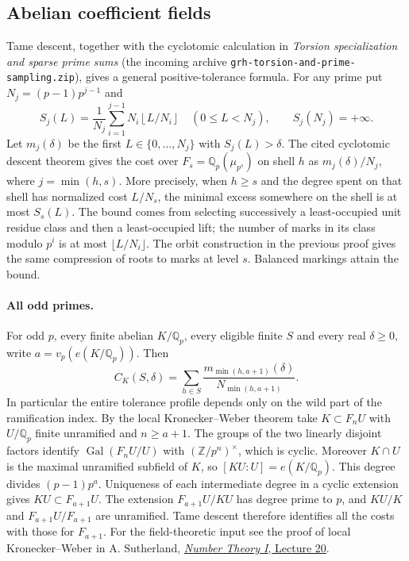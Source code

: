 \subsection*{Abelian coefficient fields}
Tame descent, together with the cyclotomic calculation in
\emph{Torsion specialization and sparse prime sums} (the incoming
archive \texttt{grh-torsion-and-prime-sampling.zip}), gives a general
positive-tolerance formula. For any prime put $N_j=(p-1)p^{j-1}$ and
\[
 S_j(L)=\frac1{N_j}\sum_{i=1}^{j-1}N_i
          \left\lfloor L/N_i\right\rfloor\quad(0\le L<N_j),
 \qquad S_j(N_j)=+\infty .
\]
Let $m_j(\delta)$ be the first $L\in\{0,\ldots,N_j\}$ with
$S_j(L)>\delta$. The cited cyclotomic descent theorem gives the cost over
$F_s=\mathbb Q_p(\mu_{p^s})$ on shell $h$ as
$m_j(\delta)/N_j$, where $j=\min(h,s)$. More precisely, when $h\ge s$
and the degree spent on that shell has normalized cost $L/N_s$, the
minimal excess somewhere on the shell is at most $S_s(L)$. The bound
comes from selecting successively a least-occupied unit residue class
and then a least-occupied lift; the number of marks in its class
modulo $p^i$ is at most $\lfloor L/N_i\rfloor$. The orbit construction
in the previous proof gives the same compression of roots to marks at
level $s$. Balanced markings attain the bound.

\paragraph{All odd primes.}
For odd $p$, every finite abelian $K/\mathbb Q_p$, every eligible finite
$S$ and every real $\delta\ge0$, write $a=v_p(e(K/\mathbb Q_p))$.
Then
\[
 C_K(S,\delta)=\sum_{h\in S}
   \frac{m_{\min(h,a+1)}(\delta)}{N_{\min(h,a+1)}} .
\]
In particular the entire tolerance profile depends only on the wild part
of the ramification index.
By the local Kronecker--Weber theorem take $K\subset F_n U$ with
$U/\mathbb Q_p$ finite unramified and $n\ge a+1$.
The groups of the two linearly disjoint factors identify
$\operatorname{Gal}(F_n U/U)$ with $(\mathbb Z/p^n)^\times$, which
is cyclic. Moreover $K\cap U$ is the maximal unramified subfield of $K$,
so $[KU:U]=e(K/\mathbb Q_p)$. This degree divides $(p-1)p^a$.
Uniqueness of each intermediate degree in a cyclic extension gives
$KU\subset F_{a+1}U$. The extension $F_{a+1}U/KU$ has degree prime to
$p$, and $KU/K$ and $F_{a+1}U/F_{a+1}$ are unramified. Tame descent
therefore identifies all the costs with those for $F_{a+1}$.
For the field-theoretic input see the proof of local Kronecker--Weber in
A. Sutherland, \href{https://math.mit.edu/classes/18.785/2017fa/LectureNotes20.pdf}
{\emph{Number Theory I}, Lecture 20}.

